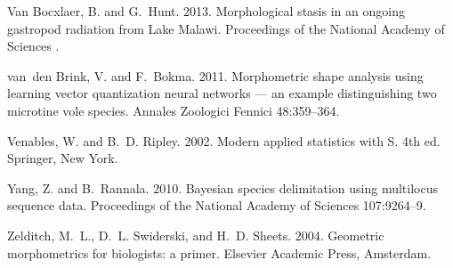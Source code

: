 \documentclass[12pt,letterpaper]{article}
\begin{document}
\begin{thebibliography}{77}
{Van Bocxlaer}, B. and G.~Hunt. 2013. {Morphological stasis in an ongoing
  gastropod radiation from Lake Malawi}. Proceedings of the National Academy of
  Sciences .

van~den Brink, V. and F.~Bokma. 2011. {Morphometric shape analysis using
  learning vector quantization neural networks — an example distinguishing
  two microtine vole species}. Annales Zoologici Fennici 48:359--364.

Venables, W. and B.~D. Ripley. 2002. {Modern applied statistics with S}. 4th
  ed. Springer, New York.

Yang, Z. and B.~Rannala. 2010. {Bayesian species delimitation using multilocus
  sequence data.} Proceedings of the National Academy of Sciences 107:9264--9.

Zelditch, M.~L., D.~L. Swiderski, and H.~D. Sheets. 2004. {Geometric
  morphometrics for biologists: a primer}. Elsevier Academic Press, Amsterdam.

\end{thebibliography}
\end{document}
